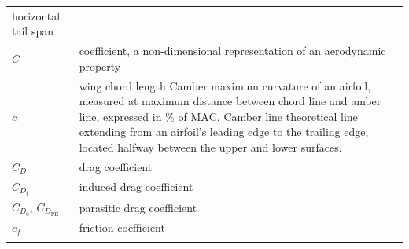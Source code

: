 \documentclass[
]{book}
\begin{document}
\begin{longtable}[]{@{}ll@{}}
\begin{minipage}[t]{0.72\columnwidth}
horizontal tail span\strut
\end{minipage}\tabularnewline
\begin{minipage}[t]{0.22\columnwidth}\raggedright
\(C\)\strut
\end{minipage} & \begin{minipage}[t]{0.72\columnwidth}\raggedright
coefficient, a non-dimensional representation of an aerodynamic property\strut
\end{minipage}\tabularnewline
\begin{minipage}[t]{0.22\columnwidth}\raggedright
\(c\)\strut
\end{minipage} & \begin{minipage}[t]{0.72\columnwidth}\raggedright
wing chord length Camber maximum curvature of an airfoil, measured at maximum distance between chord line and amber line, expressed in \% of \(\mathrm{MAC}\). Camber line theoretical line extending from an airfoil's leading edge to the trailing edge, located halfway between the upper and lower surfaces.\strut
\end{minipage}\tabularnewline
\begin{minipage}[t]{0.22\columnwidth}\raggedright
\(C_D\)\strut
\end{minipage} & \begin{minipage}[t]{0.72\columnwidth}\raggedright
drag coefficient\strut
\end{minipage}\tabularnewline
\begin{minipage}[t]{0.22\columnwidth}\raggedright
\(C_{D_i}\)\strut
\end{minipage} & \begin{minipage}[t]{0.72\columnwidth}\raggedright
induced drag coefficient\strut
\end{minipage}\tabularnewline
\begin{minipage}[t]{0.22\columnwidth}\raggedright
\(C_{D_0}\text{, }C_{D_{\mathrm{PE}}}\)\strut
\end{minipage} & \begin{minipage}[t]{0.72\columnwidth}\raggedright
parasitic drag coefficient\strut
\end{minipage}\tabularnewline
\begin{minipage}[t]{0.22\columnwidth}\raggedright
\(c_f\)\strut
\end{minipage} & \begin{minipage}[t]{0.72\columnwidth}\raggedright
friction coefficient\strut
\end{minipage}\tabularnewline
\begin{minipage}[t]{0.22\columnwidth}\raggedright

\end{minipage}
\end{longtable}
\end{document}
